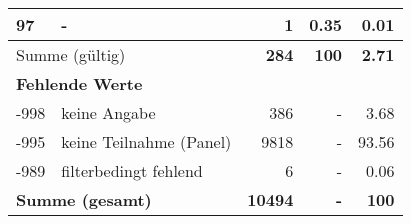 \begin{longtable}{lXrrr}
     97 &
     \multicolumn{1}{X}{ -  } &


       \num{1} &
       \num[round-mode=places,round-precision=2]{0.35} &
         \num[round-mode=places,round-precision=2]{0.01} \\
     \midrule
     \multicolumn{2}{l}{Summe (gültig)} &
       \textbf{\num{284}} &
     \textbf{\num{100}} &
       \textbf{\num[round-mode=places,round-precision=2]{2.71}} \\
     \multicolumn{5}{l}{\textbf{Fehlende Werte}}\\
       -998 &
       keine Angabe &
         \num{386} &
        - &
         \num[round-mode=places,round-precision=2]{3.68} \\
       -995 &
       keine Teilnahme (Panel) &
         \num{9818} &
        - &
         \num[round-mode=places,round-precision=2]{93.56} \\
       -989 &
       filterbedingt fehlend &
         \num{6} &
        - &
         \num[round-mode=places,round-precision=2]{0.06} \\
     \midrule
     \multicolumn{2}{l}{\textbf{Summe (gesamt)}} &
          \textbf{\num{10494}} &
        \textbf{-} &
        \textbf{\num{100}} \\
     \bottomrule
     \end{longtable}
     
